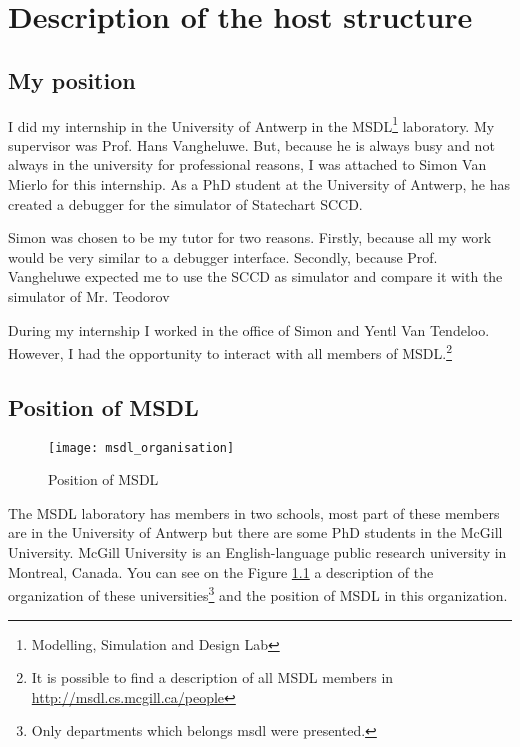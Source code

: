
\chapter{Description of the host structure}


\section{My position}

I did my internship in the University of Antwerp in the MSDL\footnote{Modelling, Simulation and Design Lab} laboratory. My supervisor was Prof. Hans Vangheluwe. But, because he is always busy and not always in the university for professional reasons, I was attached to Simon Van Mierlo for this internship. As a PhD student at the University of Antwerp, he has created a debugger for the simulator of
Statechart SCCD.

Simon was chosen to be my tutor for two reasons. Firstly, because all my work would be very similar to a debugger interface. Secondly, because Prof. Vangheluwe expected me to use the
SCCD as simulator and compare it with the simulator of Mr. Teodorov


During my internship I worked in the office of Simon and Yentl Van Tendeloo. However, I had the opportunity to interact with all members of MSDL.\footnote{It is possible to find a description of all MSDL members in \url{http://msdl.cs.mcgill.ca/people}}



\section{Position of MSDL}

\begin{figure}[h]
  \centering
  \texttt{[image: msdl\_organisation]}

  \caption{Position of MSDL}
  \label{fig:msdl_org}
\end{figure}

The MSDL laboratory has members in two schools, most part of these members are in the University of Antwerp but there are some PhD students in the McGill University. McGill University is an English-language public research university in Montreal, Canada. You can see on the Figure \ref{fig:msdl_org} a description of the organization of these universities\footnote{Only departments which belongs msdl were presented.} and the position of MSDL in this organization.


